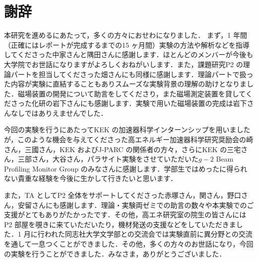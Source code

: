 \section*{謝辞}

本研究を進めるにあたって，多くの方々におせわになりました．
まず，1 年間（正確にはレポートが完成するまでの15 ヶ月間）実験の方法や解析などを指導してくださった中家さんと隅田さんに感謝します．ほとんどのメンバーが今後も大学院でお世話になりますがよろしくおねがいします．また，課題研究P2 の理論パートを担当してくださった畑さんにも同様に感謝します．理論パートで扱った内容が実験に直結することもありスムーズな実験背景の理解の助けとなりました．磁場装置の開発について助言をしてくださり，また磁場測定装置を貸してくださった化研の岩下さんにも感謝します．実験で用いた磁場装置の完成は岩下さんなしではありえませんでした．

今回の実験を行うにあたってKEK の加速器科学インターンシップを用いましたが，このような機会を与えてくださった高エネルギー加速器科学研究奨励会の崎さん，三國さん，KEK およびJ-PARC の関係者の方々，さらにKEK の三宅さん，三部さん，大谷さん，パラサイト実験をさせていただいた$g-2$ Beam Profiling Monitor Group のみなさんに感謝します．学部生ではめったに得られない貴重な経験を今後に生かして行きたいと思います．

また，TA としてP2 全体をサポートしてくださった赤塚さん，関さん，野口さん，安留さんにも感謝します．理論・実験両ゼミでの助言の数々や本実験でのご支援がとてもありがたかったです．その他，高エネ研究室の院生の皆さんにはP2 部屋を覗きに来ていただいたり，機材発送の支援などをしていただきました．1 月に行われた同志社大学文学部との交流会では実験直前に異分野との交流を通して一息つくことができました．その他，多くの方々のお世話になり，今回の実験を行うことができました．みなさま，ありがとうございました．